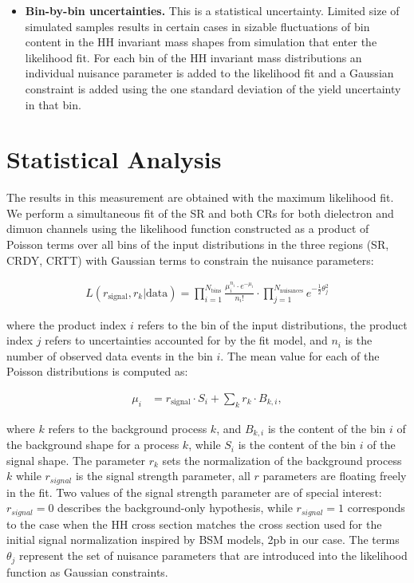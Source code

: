 \begin{itemize}
\item{\bf Bin-by-bin uncertainties.} 
This is a statistical uncertainty. Limited size of simulated samples
  results in certain cases in sizable fluctuations of bin content in
  the HH invariant mass shapes from simulation that enter the
  likelihood fit. For each bin of the HH invariant mass distributions
  an individual nuisance parameter is added to the likelihood fit and
  a Gaussian constraint is added using the one standard deviation of
  the yield uncertainty in that bin.


\end{itemize}






\section{Statistical Analysis}
\label{sec:statistics}


The results in this measurement are obtained with the maximum likelihood fit. We perform a simultaneous fit of the SR and both CRs for both dielectron and dimuon channels using the likelihood function constructed as a product
of Poisson terms over all bins of the input \mTHH distributions in the three regions (SR, CRDY, CRTT) with Gaussian terms to constrain the nuisance parameters:

\begin{align*}
 L(r_{\text{signal}}, r_{k}|\text{data}) = \prod_{i=1}^{N_{\mathrm{bins}}}\frac{\mu_{i}^{n_{i}}\cdot e^{-\mu_{i}}}{n_{i}!}
\cdot \prod_{j=1}^{N_{\mathrm{nuisances}}} e^{-\frac{1}{2}\theta_{j}^{2}}
\end{align*}

\noindent where the product index $i$ refers to the bin of the input distributions, the product index $j$
refers to uncertainties accounted for by the fit model, and $n_i$ is the number of observed data
events in the bin $i$. The mean value for each of the Poisson distributions is computed as:


\begin{align*}
\mu_{i} &= r_{\text{signal}} \cdot S_{i} + \sum_{k}r_{k}\cdot B_{k,i},
\end{align*}


\noindent where $k$ refers to the background process $k$, and $B_{k,i}$ is the content of the bin $i$ of the background
shape for a process $k$, while $S_i$ is the content of the bin $i$ of the signal shape. The parameter $r_k$
sets the normalization of the background process $k$ while $r_{signal}$ is the signal strength parameter, all $r$ parameters are floating freely in the fit.
Two values of the signal strength parameter are of special interest:  $r_{signal} = 0$ describes the
background-only hypothesis, while $r_{signal} = 1$ corresponds to the case when the HH cross section
matches the cross section used for the initial signal normalization inspired by BSM models, 2pb in our case. 
The terms $\theta_j$ represent the set of nuisance parameters that are introduced into the likelihood
function as Gaussian constraints. 


